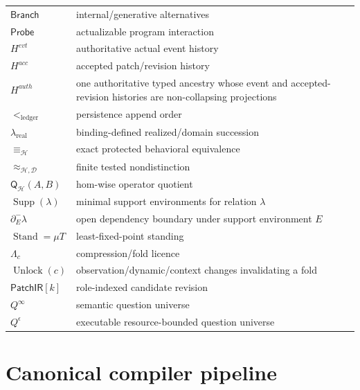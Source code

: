 \documentclass[11pt,oneside]{article}
\newcommand{\PatchIR}{\mathsf{PatchIR}}
\newcommand{\Stand}{\operatorname{Stand}}
\newcommand{\Supp}{\operatorname{Supp}}
\newcommand{\Unlock}{\operatorname{Unlock}}
\begin{document}
\begin{longtable}{>{\raggedright\arraybackslash}p{}
                  >{\raggedright\arraybackslash}p{}}
\(\mathsf{Branch}\) & internal/generative alternatives\\
\(\mathsf{Probe}\) & actualizable program interaction\\
\(H^{evt}\) & authoritative actual event history\\
\(H^{acc}\) & accepted patch/revision history\\
\(H^{auth}\) & one authoritative typed ancestry whose event and accepted-revision histories are non-collapsing projections\\
\(<_{\mathrm{ledger}}\) & persistence append order\\
\(\lambda_{\mathrm{real}}\) & binding-defined realized/domain succession\\
\(\equiv_{\mathcal H}\) & exact protected behavioral equivalence\\
\(\approx_{\mathcal H,\mathcal D}\) & finite tested nondistinction\\
\(\mathsf Q_{\mathcal H}(A,B)\) & hom-wise operator quotient\\
\(\Supp(\lambda)\) & minimal support environments for relation \(\lambda\)\\
\(\partial^-_E\lambda\) & open dependency boundary under support environment \(E\)\\
\(\Stand=\mu T\) & least-fixed-point standing\\
\(\Lambda_c\) & compression/fold licence\\
\(\Unlock(c)\) & observation/dynamic/context changes invalidating a fold\\
\(\PatchIR[k]\) & role-indexed candidate revision\\
\(Q^\infty\) & semantic question universe\\
\(Q^\epsilon\) & executable resource-bounded question universe\\
\bottomrule
\end{longtable}

\section{Canonical compiler pipeline}
\end{document}
